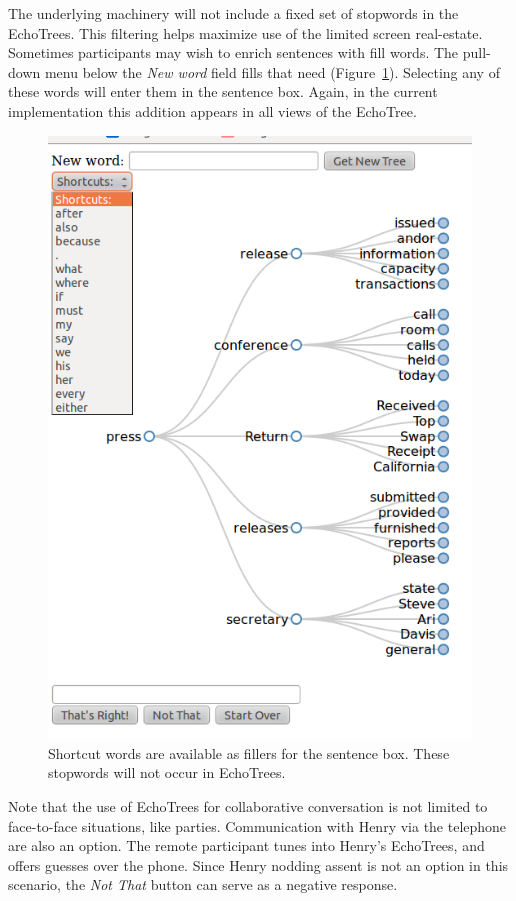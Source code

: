\documentclass{sigchi}
\begin{document}
The underlying machinery will not include a fixed set of stopwords in
the EchoTrees. This filtering helps maximize use of the limited screen
real-estate. Sometimes participants may wish to enrich sentences with
fill words. The pull-down menu below the {\em New word} field fills
that need (Figure~\ref{fig:shortcuts}). Selecting any of these words
will enter them in the sentence box. Again, in the current
implementation this addition appears in all views of the EchoTree. 
\begin{figure}
   \centering
   \includegraphics[width=\columnwidth]{Figs/echoTreePulldownSnapshotSmall.png}
   \caption{Shortcut words are available as fillers for the sentence
     box. These stopwords will not occur in EchoTrees.}
   \label{fig:shortcuts}
\end{figure}
Note that the use of EchoTrees for collaborative conversation is not
limited to face-to-face situations, like parties. Communication
with Henry via the telephone are also an option. The remote
participant tunes into Henry's EchoTrees, and offers guesses over the
phone. Since Henry nodding assent is not an option in this scenario,
the {\em Not That} button can serve as a negative response.
\end{document}

